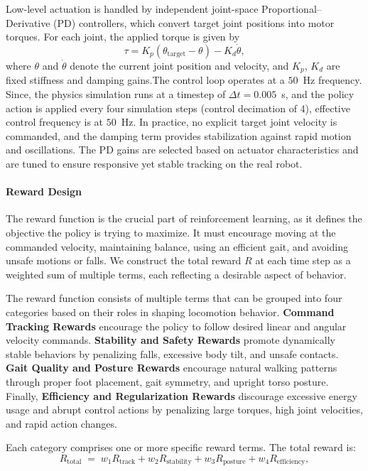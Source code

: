 Low-level actuation is handled by independent joint-space
Proportional–Derivative (PD) controllers, which convert target joint
positions into motor torques.
For each joint, the applied torque is given by
\begin{equation}
    \tau = K_p \left( \theta_{\text{target}} - \theta \right)
    - K_d \dot{\theta},
\end{equation}
where $\theta$ and $\dot{\theta}$ denote the current joint position and
velocity, and $K_p$, $K_d$ are fixed stiffness and damping gains.The control loop operates at a $50$~Hz frequency. Since, the physics simulation runs at a timestep of $\Delta t = 0.005$~s, and the policy action is applied every four simulation steps (control decimation of 4), effective control frequency is at $50$~Hz. In practice, no explicit target joint velocity is commanded, and the damping term provides stabilization against rapid motion and oscillations. The PD gains are selected based on actuator characteristics and are tuned to ensure responsive yet stable tracking on the real robot.

\paragraph{Reward Design}
\label{reward}
The reward function is the crucial part of reinforcement learning, as it defines the objective the policy
is trying to maximize. It must encourage moving at the commanded velocity, maintaining balance, using an efficient gait, and avoiding unsafe motions or falls. We construct the total reward $R$ at each time step as a weighted
sum of multiple terms, each reflecting a desirable aspect of behavior. 


The reward function consists of multiple terms that can be grouped into four categories based on their roles in shaping locomotion behavior. \textbf{Command Tracking Rewards} encourage the policy to follow desired linear and angular velocity commands. \textbf{Stability and Safety Rewards} promote dynamically stable behaviors by penalizing falls, excessive body tilt, and unsafe contacts. \textbf{Gait Quality and Posture Rewards} encourage natural walking patterns through proper foot placement, gait symmetry, and upright torso posture. Finally, \textbf{Efficiency and Regularization Rewards} discourage excessive energy usage and abrupt control actions by penalizing large torques, high joint velocities, and rapid action changes.


Each category comprises one or more specific reward terms. The total reward is:
$$ R_{\text{total}} \;=\; w_1 R_{\text{track}} + w_2 R_{\text{stability}} + w_3 R_{\text{posture}} + w_4
R_{\text{efficiency}}, $$ 

